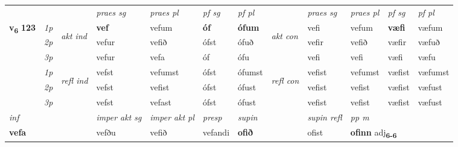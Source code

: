 \begin{longtable}[l]{X>{\footnotesize\itshape}llXXXXlXXXX}
 & &   & \textit{praes sg}  & \textit{praes pl}    & \textit{ pf sg} & \textit{pf pl} & & \textit{praes sg}  & \textit{praes pl}    & \textit{pf sg} & \textit{pf pl }  \\ \cmidrule{4-7} \cmidrule{9-12}
 \multirow{2}{*}{{{\textbf{v{\textsubscript{6}}} \Large{\textbf{123}}}}}  & 1p & \multirow{3}{*}{\begin{turn}{90}\textit{akt ind}\end{turn}} & \textbf{vef} & vefum & \textbf{óf} & \textbf{ófum} & \multirow{3}{*}{\begin{turn}{90}\textit{akt con}\end{turn}} &vefi & vefum & \textbf{væfi} & væfum\\*
 & 2p &  &  vefur  & vefið & ófst & ófuð & & vefir & vefið & væfir & væfuð \\*
 & 3p &  & vefur & vefa & óf & ófu & & vefi & vefi& væfi & væfu \\*
\cmidrule{4-7} \cmidrule{9-12}
 & 1p & \multirow{3}{*}{\begin{turn}{90}\textit{refl ind}\end{turn}}  & vefst & vefumst & ófst & ófumst & \multirow{3}{*}{\begin{turn}{90}\textit{refl con}\end{turn}}  &vefist & vefumst & væfist & væfumst \\*
 & 2p &  & vefst & vefist & ófst & ófust & &vefist & vefist & væfist & væfust \\*
 & 3p  & & vefst & vefast & ófst & ófust & & vefist & vefist& væfist & væfust \\*
\cmidrule{4-7} \cmidrule{9-12}

   {\textit{inf}} & &  & \textit{imper akt sg} & \textit{imper akt pl}   & \textit{presp} & \textit{supin} && \textit{supin refl} & \textit{pp m} \\*
  {\textbf{vefa}} & && vefðu  & vefið   & vefandi &  \textbf{ofið} && ofist & \multicolumn{2}{l}{\textbf{ofinn} adj\textbf{\textsubscript{6-6}}} \\*

\midrule


\end{longtable}
